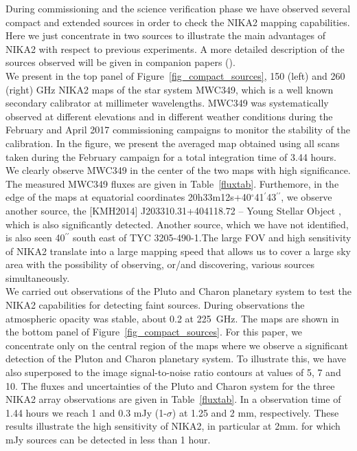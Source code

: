 \documentclass[]{aa} %
\begin{document}

During commissioning and the science verification phase we have observed several compact and extended sources 
in order to check the NIKA2 mapping capabilities. Here we just concentrate in two sources to illustrate the main advantages of NIKA2 with respect to previous experiments. A more detailed description of the sources observed will be given in companion papers (\cite{commissioning,pipeline}). \\

We present in the top panel of Figure~\ref{fig_compact_sources}, 150 (left) and 260 (right) GHz NIKA2 maps of the star system MWC349, which is a well known secondary calibrator at millimeter wavelengths. MWC349 was systematically observed at different elevations and in different weather conditions during the February and April 2017 commissioning campaigns to monitor the stability of the calibration. In the figure, we present the averaged map obtained using all scans taken during the February
campaign for a total integration time of 3.44 hours. We clearly observe MWC349 in the center of the two maps with high significance. The measured MWC349 fluxes are given in Table~\ref{fluxtab}. Furthemore, in the edge of the maps at equatorial coordinates 20h33m12s+40$^{\circ}$41$^{\prime}$43$^{\prime \prime}$, we observe another source, the [KMH2014] J203310.31+404118.72 -- Young Stellar Object , which is also significantly detected. Another source, which we have not identified, is also seen 40$^{\prime \prime}$ south east of TYC 3205-490-1.The large FOV and high sensitivity of NIKA2 translate into a large mapping speed that allows us to cover a large sky area with the possibility of observing, or/and discovering, various sources simultaneously. \\

We carried out observations of the Pluto and Charon planetary system to test the NIKA2 capabilities for detecting faint sources. During observations the atmospheric opacity was stable, about 0.2 at 225~GHz.
The maps are shown in the bottom panel of Figure~\ref{fig_compact_sources}. For this paper, we concentrate only on the central region of the maps where we observe a significant detection of the Pluton and Charon planetary system. To illustrate this, we have also superposed to the image signal-to-noise ratio contours at values of 5, 7 and 10. The fluxes and uncertainties of the Pluto and Charon system for the three NIKA2 array observations are given in Table~\ref{fluxtab}. In a observation time of 1.44 hours we reach 1 and 0.3 mJy (1-$\sigma$) at 1.25 and 2 mm, respectively.
These results illustrate the high sensitivity of NIKA2, in particular at 2mm. for which mJy sources can be detected in less than 1 hour.
\end{document}
